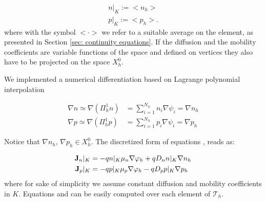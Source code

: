  \begin{align*}
 n|_K := <n_h> \\ 
p|_K := <p_h>.
 \end{align*}
where with the symbol $<\cdot >$ we refer to a suitable average on the element, as presented in Section \ref{sec: continuity equations}. If the diffusion and the mobility coefficients are variable functions of the space and defined on vertices they also have to be projected on the space $X_h^0$.

We implemented a numerical differentiation based on Lagrange polynomial interpolation

\begin{align*}
\nabla n \simeq \nabla (\Pi^1_h n) & = \sum_{i=1}^{N_h} n_i \nabla \psi_i = \nabla n_h \\
\nabla p \simeq \nabla (\Pi^1_h p) & = \sum_{i=1}^{N_h} p_i \nabla \psi_i = \nabla p_h
\end{align*}
 
Notice that $\nabla n_h, \, \nabla p_h \in X_h^0$.
The discretized form of equations ,  reads as:

\begin{align}
\mathbf{J}_n|_K &= -qn|_K\mu_n\nabla \varphi_h + qD_n n|_K\nabla n_h \label{eq: Jn DD discrete}\\ 
\mathbf{J}_p|_K &= -qp|_K\mu_p\nabla \varphi_h - qD_p p|_K \nabla p_h \label{eq: Jp DD discrete} 
\end{align}
where for sake of simplicity we assume constant diffusion and mobility coefficients in $K$.
Equations  and  can be easily computed over each element of $\mathcal{T}_h$.

%
%
%
%
 

